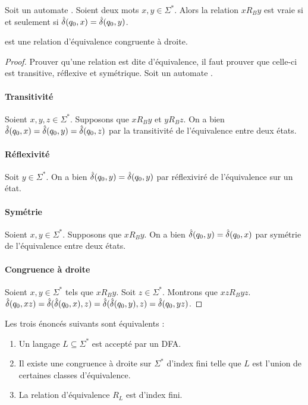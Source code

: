 	\begin{definition}[Relation \rb]
		Soit un automate \automaton. Soient deux mots $x,y\in\Sigma^*$. Alors la relation $xR_By$ est vraie si et seulement si $\hat{\delta}(q_0,x)=\hat{\delta}(q_0,y)$.
	\end{definition}

	\begin{lemma}
		\rb est une relation d'équivalence congruente à droite.
	\end{lemma}

	\begin{proof}
		Prouver qu'une relation est dite d'équivalence, il faut prouver que celle-ci est transitive, réflexive et symétrique.
		Soit un automate \automaton.
		\paragraph{Transitivité} Soient $x,y,z\in\Sigma^*$. Supposons que $xR_By$ et $yR_Bz$. On a bien $\hat{\delta}(q_0,x)=\hat{\delta}(q_0,y)=\hat{\delta}(q_0,z)$ par la transitivité de l'équivalence entre deux états.
		\paragraph{Réflexivité} Soit $y\in\Sigma^*$. On a bien $\hat{\delta}(q_0,y)=\hat{\delta}(q_0,y)$ par réflexiviré de l'équivalence sur un état.
		\paragraph{Symétrie} Soient $x,y\in\Sigma^*$. Supposons que $xR_By$. On a bien $\hat{\delta}(q_0,y)=\hat{\delta}(q_0,x)$ par symétrie de l'équivalence entre deux états.
		\paragraph{Congruence à droite} Soient $x,y\in\Sigma^*$ tels que $xR_By$. Soit $z\in\Sigma^*$. Montrons que $xzR_Byz$. $\hat{\delta}(q_0,xz)=\hat{\delta}(\hat{\delta}(q_0,x),z)=\hat{\delta}(\hat{\delta}(q_0,y),z)=\hat{\delta}(q_0,yz)$.
	\end{proof}

	\begin{theorem}
		Les trois énoncés suivants sont équivalents :
		\begin{enumerate}
			\item Un langage $L\subseteq\Sigma^*$ est accepté par un DFA.
			\item Il existe une congruence à droite sur $\Sigma^*$ d'index fini telle que $L$ est l'union de certaines classes d'équivalence.
			\item La relation d'équivalence $R_L$ est d'index fini.
		\end{enumerate}
	\end{theorem}





